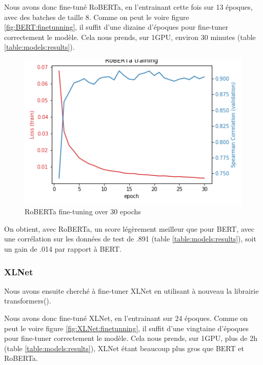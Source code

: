 \documentclass[11pt,a4paper, french]{article}
\begin{document}
Nous avons donc fine-tuné RoBERTa, en l'entrainant cette fois sur 13 époques, avec des batches de taille 8. Comme on peut le voire figure \ref{fig:BERT:finetunning}, il suffit d'une dizaine d'époques pour fine-tuner correctement le modèle. Cela nous prends, sur 1GPU, environ 30 minutes (table \ref{table:models:results}).

\begin{figure}
  \includegraphics[width=\linewidth]{resources/roberta-training.png}
  \caption{RoBERTa fine-tuning over 30 epochs}
  \label{fig:RoBERTa:finetunning}
\end{figure}

On obtient, avec RoBERTa, un score légèrement meilleur que pour BERT, avec une corrélation sur les données de test de .891 (table \ref{table:models:results}), soit un gain de .014 par rapport à BERT.

%
\subsubsection{XLNet}

Nous avons ensuite cherché à fine-tuner XLNet en utilisant à nouveau la librairie transformers(\cite{huggingface}).

Nous avons donc fine-tuné XLNet, en l'entrainant sur 24 époques. Comme on peut le voire figure \ref{fig:XLNet:finetunning}, il suffit d'une vingtaine d'époques pour fine-tuner correctement le modèle. Cela nous prends, sur 1GPU, plus de 2h (table \ref{table:models:results}), XLNet étant beaucoup plus gros que BERT et RoBERTa.
\end{document}
